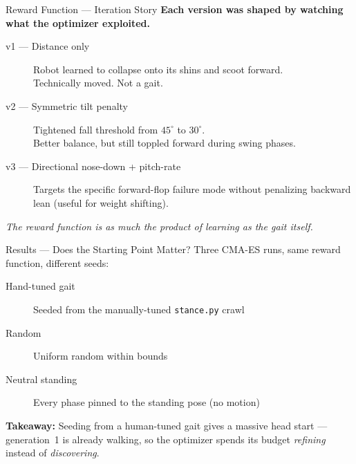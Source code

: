 \documentclass[aspectratio=169]{beamer}
\begin{document}
\begin{frame}{Reward Function --- Iteration Story}
\textbf{Each version was shaped by watching what the optimizer exploited.}

\vspace{0.5em}
\begin{description}
    \item[v1 --- Distance only] Robot learned to collapse onto its shins and scoot forward.\\
        Technically moved. Not a gait.
    \item[v2 --- Symmetric tilt penalty] Tightened fall threshold from $45^\circ$ to $30^\circ$.\\
        Better balance, but still toppled forward during swing phases.
    \item[v3 --- Directional nose-down + pitch-rate] Targets the specific forward-flop failure mode without penalizing backward lean (useful for weight shifting).
\end{description}

\vspace{0.5em}
\emph{The reward function is as much the product of learning as the gait itself.}
\end{frame}

\begin{frame}{Results --- Does the Starting Point Matter?}
Three CMA-ES runs, same reward function, different seeds:

\vspace{0.3em}
\begin{description}
    \item[Hand-tuned gait] Seeded from the manually-tuned \texttt{stance.py} crawl
    \item[Random] Uniform random within bounds
    \item[Neutral standing] Every phase pinned to the standing pose (no motion)
\end{description}

\vspace{0.5em}

\vspace{0.3em}
\textbf{Takeaway:} Seeding from a human-tuned gait gives a massive head start --- generation~1 is already walking, so the optimizer spends its budget \emph{refining} instead of \emph{discovering}.
\end{frame}
\end{document}
